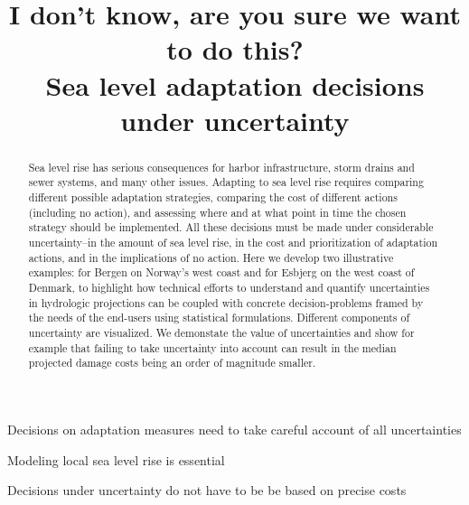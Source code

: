 \documentclass[draft,linenumbers]{agujournal}
\begin{document}
\title{I don't know, are you sure we want to do this?\\
Sea level adaptation decisions under uncertainty}




\begin{keypoints}
\item Decisions on adaptation measures need to take careful account of all uncertainties
\item Modeling local sea level rise is essential
\item Decisions under uncertainty do not have to be be based on precise costs
\end{keypoints}


\begin{abstract}
Sea level rise has serious consequences for harbor infrastructure, storm drains and sewer systems, and many other issues. Adapting to sea level rise requires comparing different possible adaptation strategies, comparing the cost of different actions (including no action), and assessing where and at what point in time the chosen strategy should be implemented. All these decisions must be made under considerable uncertainty--in the amount of sea level rise, in the cost and prioritization of adaptation actions, and in the implications of no action. Here we develop two illustrative examples: for Bergen on Norway's west coast and for Esbjerg on the west coast of Denmark, to highlight how technical efforts to understand and quantify uncertainties in hydrologic projections can be coupled with concrete decision-problems framed by the needs of the end-users using statistical formulations. Different components of uncertainty are visualized. We demonstate the value of uncertainties and show for example that failing to take uncertainty into account can  result in the median projected damage costs being an order of magnitude smaller. 
\end{abstract}


\end{document}
